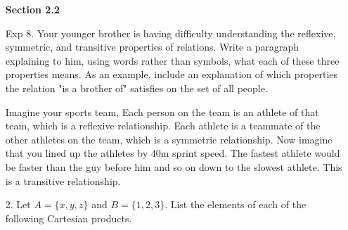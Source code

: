 \documentclass{article}
\def\rectset{(-4,-2.5) rectangle (2,2)}
\def\circleone{(-1.9,0.5) circle (1.2cm)}
\def\circletwo{(-0.1,0.5) circle (1.2cm)}
\def\circlethree{(-1,-1) circle (1.2cm)}
\begin{document}
\begin{itemize}
\begin{multicols}{2}
    \end{multicols}
    
    
    \textbf{Section 2.2}
    
    \item[Exp 8.] Your younger brother is having difficulty understanding the reflexive, symmetric, and transitive properties of relations.  Write a paragraph explaining to him, using words rather than symbols, what each of these three properties means.  As an example, include an explanation of which properties the relation "is a brother of" satisfies on the set of all people. 
    
    {\color{blue} Imagine your sports team, Each person on the team is an athlete of that team, which is a reflexive relationship.  Each athlete is a teammate of the other athletes on the team, which is a symmetric relationship.  Now imagine that you lined up the athletes by 40m sprint speed.  The fastest athlete would be faster than the guy before him and so on down to the slowest athlete.  This is a transitive relationship.}
    
    {\color{blue} }
    
    \item[2.] Let $A = \{x, y, z\}$ and $B = \{1, 2, 3\}$. List the elements of each of the following Cartesian products.
    

\end{itemize}
\end{document}

